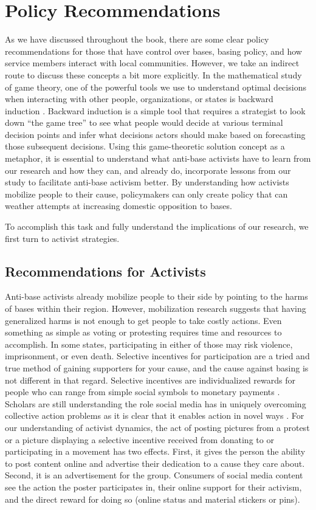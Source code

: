 \section*{Policy Recommendations}

As we have discussed throughout the book, there are some clear policy recommendations for those that have control over bases, basing policy, and how service members interact with local communities. However, we take an indirect route to discuss these concepts a bit more explicitly. In the mathematical study of game theory, one of the powerful tools we use to understand optimal decisions when interacting with other people, organizations, or states is backward induction \cite{myerson2013}. Backward induction is a simple tool that requires a strategist to look down ``the game tree'' to see what people would decide at various terminal decision points and infer what decisions actors should make based on forecasting those subsequent decisions. Using this game-theoretic solution concept as a metaphor, it is essential to understand what anti-base activists have to learn from our research and how they can, and already do, incorporate lessons from our study to facilitate anti-base activism better. By understanding how activists mobilize people to their cause, policymakers can only create policy that can weather attempts at increasing domestic opposition to bases. 

To accomplish this task and fully understand the implications of our research, we first turn to activist strategies.

\subsection*{Recommendations for Activists}

Anti-base activists already mobilize people to their side by pointing to the harms of bases within their region. However, mobilization research suggests that having generalized harms is not enough to get people to take costly actions. Even something as simple as voting or protesting requires time and resources to accomplish. In some states, participating in either of those may risk violence, imprisonment, or even death. Selective incentives for participation are a tried and true method of gaining supporters for your cause, and the cause against basing is not different in that regard. Selective incentives are individualized rewards for people who can range from simple social symbols to monetary payments \cite{Olson1965}. Scholars are still understanding the role social media has in uniquely overcoming collective action problems as it is clear that it enables action in novel ways \cite{saebo2020}. For our understanding of activist dynamics, the act of posting pictures from a protest or a picture displaying a selective incentive received from donating to or participating in a movement has two effects. First, it gives the person the ability to post content online and advertise their dedication to a cause they care about. Second, it is an advertisement for the group. Consumers of social media content see the action the poster participates in, their online support for their activism, and the direct reward for doing so (online status and material stickers or pins).

